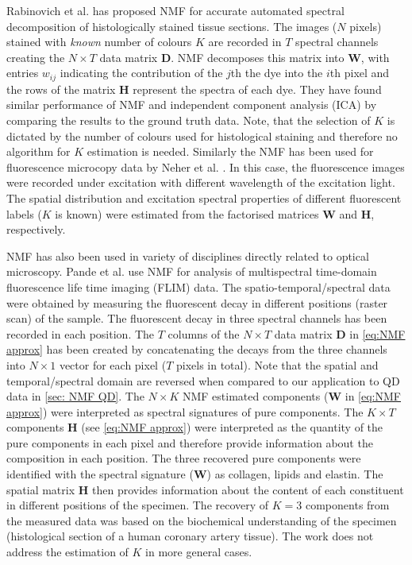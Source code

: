 Rabinovich et al. \cite{Rabinovich2003} has proposed NMF for accurate automated spectral decomposition of histologically stained tissue sections. The images ($N$ pixels) stained with {\it known} number of colours $K$ are recorded in $T$ spectral channels creating the $N\times T$ data matrix $\bm{D}$. NMF decomposes this matrix into $\bm{W}$, with entries $w_{ij}$ indicating the contribution of the  $j$th the dye into the $i$th pixel and the rows of the matrix $\bm{H}$ represent the spectra of each dye. They have found similar performance of NMF and independent component analysis (ICA) by comparing the results to the ground truth data. Note, that the selection of $K$ is dictated by the number of colours used for histological staining and therefore no algorithm for $K$ estimation is needed. Similarly the NMF has been used  for fluorescence microcopy data by Neher et al. \cite{Neher2009}. In this case, the  fluorescence images were recorded under excitation with different wavelength of the excitation light. The spatial distribution and excitation spectral properties of different fluorescent labels ($K$ is known) were estimated from the factorised matrices $\bm{W}$ and $\bm{H}$, respectively.

NMF has also been used in variety of disciplines directly related to optical microscopy. Pande et al. \cite{Pande2012} use NMF for analysis of multispectral time-domain fluorescence life time imaging (FLIM) data. The spatio-temporal/spectral data were obtained by measuring the fluorescent decay in different positions (raster scan) of the sample. The fluorescent decay in three spectral channels has been recorded in each position. The $T$ columns of the $N\times T$ data matrix $\bm{D}$ in \autoref{eq:NMF approx} has been created by concatenating the decays from the three channels into $N\times 1$ vector for each pixel ($T$ pixels in total). Note that the spatial and temporal/spectral domain are reversed when compared to our application to QD data in \autoref{sec: NMF QD}. The $N\times K$ NMF estimated components ($\bm{W}$ in \autoref{eq:NMF approx}) were interpreted as spectral signatures of pure components. The $K\times T$ components $\bm{H}$  (see \autoref{eq:NMF approx}) were interpreted as the quantity of the pure components in each pixel and therefore provide information about the  composition in each position. The three recovered pure components were identified with the spectral signature ($\bm{W}$) as collagen, lipids and elastin. The spatial matrix $\bm{H}$ then provides information about the content of each constituent in different positions of the specimen. The recovery of $K=3$ components from the measured data was based on the biochemical understanding of the specimen (histological section of a human coronary artery tissue). The work does not address the estimation of $K$ in more general cases.



